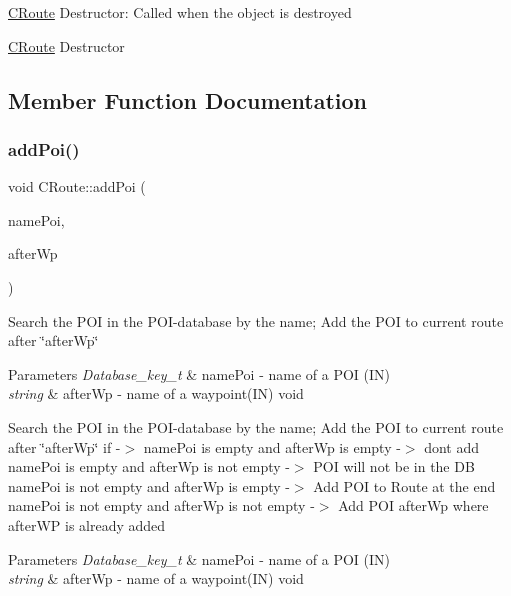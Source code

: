 \hyperlink{classCRoute}{C\+Route} Destructor\+: Called when the object is destroyed

\hyperlink{classCRoute}{C\+Route} Destructor 

\subsection{Member Function Documentation}
\mbox{\label{classCRoute_ab925dec9a729fbcad96f85065df36b61}} 
\subsubsection{\texorpdfstring{add\+Poi()}{addPoi()}}
{\footnotesize\ttfamily void C\+Route\+::add\+Poi (\begin{DoxyParamCaption}\item[{\hyperlink{CRoute_8h_a112678f2c32c39b2d50c558d89dbde68}{Database\+\_\+key\+\_\+t}}]{name\+Poi,  }\item[{std\+::string}]{after\+Wp }\end{DoxyParamCaption})}

Search the P\+OI in the P\+O\+I-\/database by the name; Add the P\+OI to current route after \char`\"{}after\+Wp\char`\"{} 
\begin{DoxyParams}{Parameters}
{\em Database\+\_\+key\+\_\+t} & name\+Poi -\/ name of a P\+OI (IN) \\
\hline
{\em string} & after\+Wp -\/ name of a waypoint(\+I\+N)  void\\
\hline
\end{DoxyParams}
Search the P\+OI in the P\+O\+I-\/database by the name; Add the P\+OI to current route after \char`\"{}after\+Wp\char`\"{} if -\/$>$ name\+Poi is empty and after\+Wp is empty -\/$>$ don\textquotesingle{}t add name\+Poi is empty and after\+Wp is not empty -\/$>$ P\+OI will not be in the DB name\+Poi is not empty and after\+Wp is empty -\/$>$ Add P\+OI to Route at the end name\+Poi is not empty and after\+Wp is not empty -\/$>$ Add P\+OI after\+Wp where after\+WP is already added


\begin{DoxyParams}{Parameters}
{\em Database\+\_\+key\+\_\+t} & name\+Poi -\/ name of a P\+OI (IN) \\
\hline
{\em string} & after\+Wp -\/ name of a waypoint(\+I\+N)  void \\
\hline
\end{DoxyParams}
\mbox{\label{classCRoute_ade32420c69c3b4bb2e6068619607f279}} 
